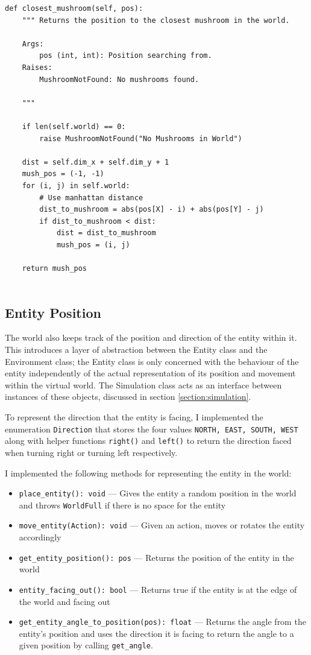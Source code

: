 \documentclass[12pt,a4paper,twoside,openright]{report}
\renewcommand{\baselinestretch}{1.1}    %
\begin{document}
{\renewcommand{\baselinestretch}{0.8}\small
\begin{verbatim}
def closest_mushroom(self, pos):
    """ Returns the position to the closest mushroom in the world.
    
    Args:
        pos (int, int): Position searching from.
    Raises:
        MushroomNotFound: No mushrooms found.

    """

    if len(self.world) == 0:
        raise MushroomNotFound("No Mushrooms in World")
        
    dist = self.dim_x + self.dim_y + 1
    mush_pos = (-1, -1)
    for (i, j) in self.world:
        # Use manhattan distance
        dist_to_mushroom = abs(pos[X] - i) + abs(pos[Y] - j)
        if dist_to_mushroom < dist:
            dist = dist_to_mushroom
            mush_pos = (i, j)

    return mush_pos
	
\end{verbatim}
}

\subsection{Entity Position}

The world also keeps track of the position and direction of the entity within it. This introduces a layer of abstraction between the Entity class and the Environment class; the Entity class is only concerned with the behaviour of the entity independently of the actual representation of its position and movement within the virtual world. The Simulation class acts as an interface between instances of these objects, discussed in section \ref{section:simulation}.

To represent the direction that the entity is facing, I implemented the enumeration \texttt{Direction} that stores the four values \texttt{NORTH, EAST, SOUTH, WEST} along with helper functions \texttt{right()} and \texttt{left()} to return the direction faced when turning right or turning left respectively.

I implemented the following methods for representing the entity in the world:

\begin{itemize}
	\item \texttt{place\_entity(): void} --- Gives the entity a random position in the world and throws \texttt{WorldFull} if there is no space for the entity
	\item \texttt{move\_entity(Action): void} --- Given an action, moves or rotates the entity accordingly
	\item \texttt{get\_entity\_position(): pos} --- Returns the position of the entity in the world
	\item \texttt{entity\_facing\_out(): bool} --- Returns true if the entity is at the edge of the world and facing out
	\item \texttt{get\_entity\_angle\_to\_position(pos): float} --- Returns the angle from the entity's position and uses the direction it is facing to return the angle to a given position by calling \texttt{get\_angle}.
\end{itemize}
\end{document}
